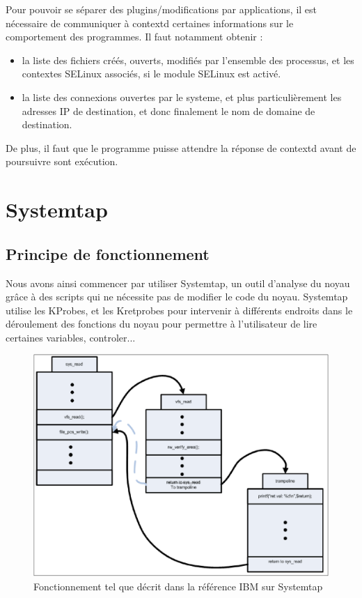 \documentclass[pdftex,a4paper,titlepage,11pt,openright]{article}
\begin{document}
Pour pouvoir se séparer des plugins/modifications par applications, il est nécessaire de communiquer à contextd certaines informations sur le comportement des programmes. Il faut notamment obtenir :
\begin{itemize}
	\item la liste des fichiers créés, ouverts, modifiés par l'ensemble des processus, et les contextes SELinux associés, si le module SELinux est activé.
	\item la liste des connexions ouvertes par le systeme, et plus particulièrement les adresses IP de destination, et donc finalement le nom de domaine de destination.\\
\end{itemize}

De plus, il faut que le programme puisse attendre la réponse de contextd avant de poursuivre sont exécution.

\section{Systemtap}

\subsection{Principe de fonctionnement}

Nous avons ainsi commencer par utiliser Systemtap, un outil d'analyse du noyau grâce à des scripts qui ne nécessite pas de modifier le code du noyau. Systemtap utilise les KProbes, et les Kretprobes\cite{IBMRBST} pour intervenir à différents endroits dans le déroulement des fonctions du noyau pour permettre à l'utilisateur de lire certaines variables, controler... %

\begin{figure}[hb]
	\centering
	\includegraphics[scale=0.4]{kretprob.png}
	\caption{Fonctionnement tel que décrit dans la référence IBM sur Systemtap \cite{IBMRBST}}
\end{figure}
\end{document}
